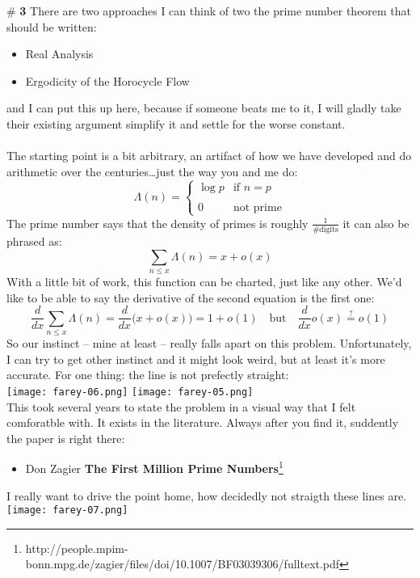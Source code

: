 \documentclass[12pt]{article}
\begin{document}
\noindent \# \textbf{3} There are two approaches I can think of two the prime number theorem that should be written:
\begin{itemize}
\item Real Analysis
\item Ergodicity of the Horocycle Flow
\end{itemize}
and I can put this up here, because if someone beats me to it, I will gladly take their existing argument simplify it and settle for the worse constant.  \\ \\
The starting point is a bit arbitrary, an artifact of how we have developed and do arithmetic over the centuries\dots just the way you and me do:
$$ \Lambda(n) = \left\{ \begin{array}{cl} \log p & \text{if }n=p \\ \\
0 & \text{not prime}\end{array} \right. $$
The prime number says that the density of primes is roughly $ \frac{1}{\text{\# digits}} $ it can also be phrased as:
$$ \sum_{n \leq x} \Lambda(n)  = x + o(x) $$
With a little bit of work, this function can be charted, just like any other. 
We'd like to be able to say the derivative of the second equation is the first one:
$$ \frac{d}{dx} \sum_{n \leq x} \Lambda(n)  = \frac{d}{dx}  \big( x + o(x) \big) = 1 + o(1)  \quad\text{but}\quad \frac{d}{dx} o(x) \stackrel{?}{=} o(1)$$
So our instinct -- mine at least -- really falls apart on this problem.  Unfortunately, I can try to get other instinct and it might look weird, but at least it's more accurate.  For one thing: the line is not prefectly straight: \\
\texttt{[image: farey-06.png]}\hfill
\texttt{[image: farey-05.png]}\\
This took several years to state the problem in a visual way that I felt comforatble with.  It exists in the literature.  Always after you find it, suddently the paper is right there:
\begin{itemize}
\item Don Zagier \textbf{The First Million Prime Numbers}\footnote{http://people.mpim-bonn.mpg.de/zagier/files/doi/10.1007/BF03039306/fulltext.pdf}
\end{itemize}
I really want to drive the point home, how decidedly not straigth these lines are. \\
\texttt{[image: farey-07.png]} \\ 
\end{document}
